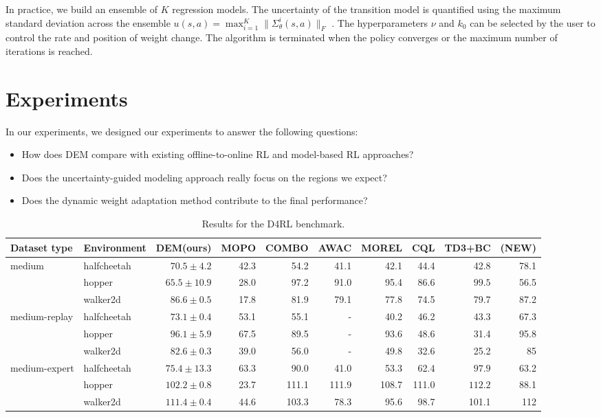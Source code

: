 \documentclass[letterpaper]{article} %
\begin{document}
In practice, we build an ensemble of $K$ regression models. The uncertainty of the transition model is quantified using the maximum standard deviation across the ensemble $u(s, a) = \max_{i=1}^K \|\Sigma_{\theta}^i(s, a)\|_F$ \cite{mopo}. The hyperparameters \( \nu \) and \( k_0 \) can be selected by the user to control the rate and position of weight change. The algorithm is terminated when the policy converges or the maximum number of iterations is reached.

\section{Experiments}
In our experiments, we designed our experiments to answer the following questions:
\begin{itemize}
\item How does DEM compare with existing offline-to-online RL and model-based RL approaches?
\item Does the uncertainty-guided modeling approach really focus on the regions we expect?
\item Does the dynamic weight adaptation method contribute to the final performance?
\end{itemize}

\begin{table}[!tb]
  \centering
  \begin{tabular}{llrrrrrrrr}
    \toprule
    \textbf{Dataset type} & \textbf{Environment} & \textbf{DEM(ours)} &  \textbf{MOPO} & \textbf{COMBO} & \textbf{AWAC} & \textbf{MOREL} & \textbf{CQL} & \textbf{TD3+BC} & \textbf{(NEW)} \\
    \midrule
    medium & halfcheetah  & $\mathbf{70.5 \pm 4.2}$ & 42.3 & 54.2 & 41.1 & 42.1 & 44.4 & 42.8 & 78.1 \\
           & hopper  & $65.5 \pm 10.9$ & 28.0 & 97.2 & 91.0 & 95.4 & 86.6 & $\mathbf{99.5}$ & 56.5\\
           & walker2d  & $\mathbf{86.6 \pm 0.5}$ & 17.8 & 81.9 & 79.1 & 77.8 & 74.5 & 79.7 & 87.2\\

    medium-replay & halfcheetah  & $\mathbf{73.1 \pm 0.4}$ & 53.1 & 55.1 & - & 40.2 & 46.2 & 43.3 & 67.3\\
            & hopper  & $\mathbf{96.1 \pm 5.9}$ & 67.5 & 89.5 & - & 93.6 & 48.6 & 31.4 & 95.8\\
            & walker2d  & $\mathbf{82.6 \pm 0.3}$ & 39.0 & 56.0 & - & 49.8 & 32.6 & 25.2 & 85\\

    medium-expert & halfcheetah  & $75.4 \pm 13.3$ & 63.3 & 90.0 & 41.0 & 53.3 & 62.4 & $\mathbf{97.9}$ & 63.2\\
            & hopper  & $102.2 \pm 0.8$ & 23.7 & 111.1 & 111.9 & 108.7 & 111.0 & $\mathbf{112.2}$ & 88.1\\
            & walker2d  & $\mathbf{111.4 \pm 0.4}$ & 44.6 & 103.3 & 78.3 & 95.6 & 98.7 & 101.1 & 112\\
    \bottomrule
  \end{tabular}
  \caption{Results for the D4RL benchmark.}
  \label{tab:Performance}
\end{table}
\end{document}
